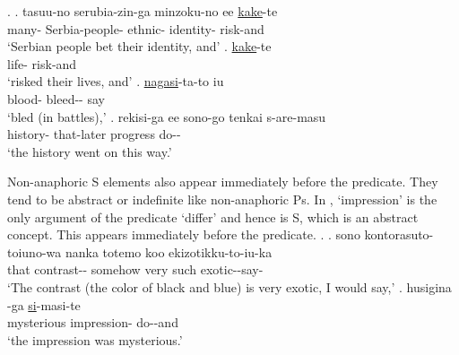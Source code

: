 \ex.\label{S00M0199_inoti}
 \ag. tasuu-no serubia-zin-ga minzoku-no ee  \ul{kake}-te \\
 	many- Serbia-people- ethnic-  identity- risk-and \\
	`Serbian people bet their identity, and'
 \bg.  \ul{kake}-te \\
 		life- risk-and \\
		`risked their lives, and'
 \bg.  \ul{nagasi}-ta-to iu \\
 		blood- bleed-- say \\
		`bled (in battles),'
 \bg. rekisi-ga ee sono-go tenkai s-are-masu \\
 	history-  that-later progress do-- \\
	`the history went on this way.'

Non-anaphoric S elements also appear immediately before the predicate.
They tend to be abstract or indefinite like non-anaphoric Ps.
In \Next,
 `impression' is the only argument of the predicate  `differ' and hence is S,
which is an abstract concept.
This appears immediately before the predicate.
%
\ex.\label{S00F0014_kanzi}
 \ag. sono kontorasuto-toiuno-wa nanka totemo koo ekizotikku-to-iu-ka \\
 	that contrast-- somehow very such exotic--say- \\
	`The contrast (the color of black and blue) is very exotic, I would say,'
 \bg. husigina -ga \ul{si}-masi-te \\
 		mysterious impression- do--and \\
		`the impression was mysterious.'
%

